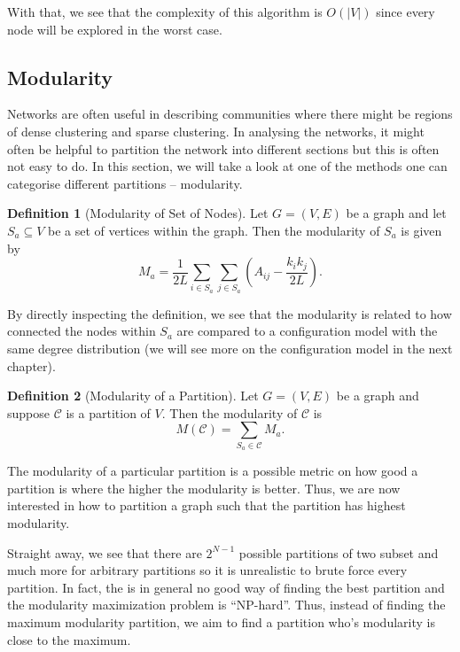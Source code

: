 \documentclass[
]{article}
\theoremstyle{definition}
\theoremstyle{definition}
\newtheorem{definition}{Definition}[section]
\begin{document}
With that, we see that the complexity of this algorithm is
\(O(\left|V\right|)\) since every node will be explored in the worst
case.

\hypertarget{modularity}{%
\subsection{Modularity}\label{modularity}}

Networks are often useful in describing communities where there might be
regions of dense clustering and sparse clustering. In analysing the
networks, it might often be helpful to partition the network into
different sections but this is often not easy to do. In this section, we
will take a look at one of the methods one can categorise different
partitions -- modularity.

\begin{definition}[Modularity of Set of Nodes]
  Let \(G = (V, E)\) be a graph and let \(S_a \subseteq V\) be a set of vertices 
  within the graph. Then the modularity of \(S_a\) is given by 
  \[M_a = \frac{1}{2L} \sum_{i \in S_a} \sum_{j \in S_a} 
    \left(A_{ij} - \frac{k_i k_j}{2L}\right).\]
\end{definition}

By directly inspecting the definition, we see that the modularity is
related to how connected the nodes within \(S_a\) are compared to a
configuration model with the same degree distribution (we will see more
on the configuration model in the next chapter).

\begin{definition}[Modularity of a Partition]
  Let \(G = (V, E)\) be a graph and suppose \(\mathcal{C}\) is a partition of 
  \(V\). Then the modularity of \(\mathcal{C}\) is 
  \[M(\mathcal{C}) = \sum_{S_a \in \mathcal{C}} M_a.\]
\end{definition}

The modularity of a particular partition is a possible metric on how
good a partition is where the higher the modularity is better. Thus, we
are now interested in how to partition a graph such that the partition
has highest modularity.

Straight away, we see that there are \(2^{N - 1}\) possible partitions
of two subset and much more for arbitrary partitions so it is
unrealistic to brute force every partition. In fact, the is in general
no good way of finding the best partition and the modularity
maximization problem is ``NP-hard''. Thus, instead of finding the
maximum modularity partition, we aim to find a partition who's
modularity is close to the maximum.
\end{document}
